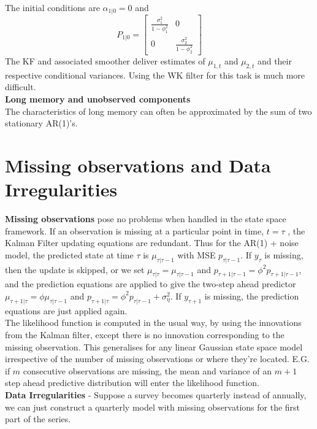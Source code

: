 \documentclass[DIV=14,titlepage=false]{scrreprt}
\begin{document}
The initial conditions are $\alpha_{1|0}=0$ and 
\[
    P_{1|0} = \begin{bmatrix}
        \frac{\sigma^2_1}{1-\phi^2_1} & 0 \\ 
        0 & \frac{\sigma^2_2}{1-\phi^2_2}
    \end{bmatrix}
\]
The KF and associated smoother deliver estimates of $\mu_{1,t}$ and $\mu_{2,t}$ and their respective conditional variances. Using the WK filter for this task is much more difficult.\\
\textbf{Long memory and unobserved components}\\
The characteristics of long memory can often be approximated by the sum of two stationary AR(1)'s.
\section{Missing observations and Data Irregularities}
\textbf{Missing observations} pose no problems when handled in the state space framework. If an observation is missing at a particular point in time, $t = \tau$ , the Kalman Filter updating equations are redundant. Thus for the AR(1) + noise model, the predicted state at time $\tau$ is $\mu_{\tau|\tau-1}$ with MSE $p_{\tau|\tau-1}$. If $y_\tau$ is missing, then the update is skipped, or we set $\mu_{\tau|\tau} = \mu_{\tau|\tau-1}$ and $p_{\tau+1|\tau-1} = \phi^2 p_{\tau+1|\tau-1}$, and the prediction equations are applied to give the two-step ahead predictor $\mu_{\tau+1|\tau} = \phi \mu_{\tau|\tau-1}$ and $p_{\tau+1|\tau} = \phi^2 p_{\tau|\tau-1} + \sigma^2_\eta$. If $y_{\tau+1}$ is missing, the prediction equations are just applied again.\\
The likelihood function is computed in the usual way, by using the innovations from the Kalman filter, except there is no innovation corresponding to the missing observation. This generalises for any linear Gaussian state space model irrespective of the number of missing observations or where they're located. E.G. if $m$ consecutive observations are missing, the mean and variance of an $m+1$ step ahead predictive distribution will enter the likelihood function.\\
\textbf{Data Irregularities} - Suppose a survey becomes quarterly instead of annually, we can just construct a quarterly model with missing observations for the first part of the series.
\end{document}
